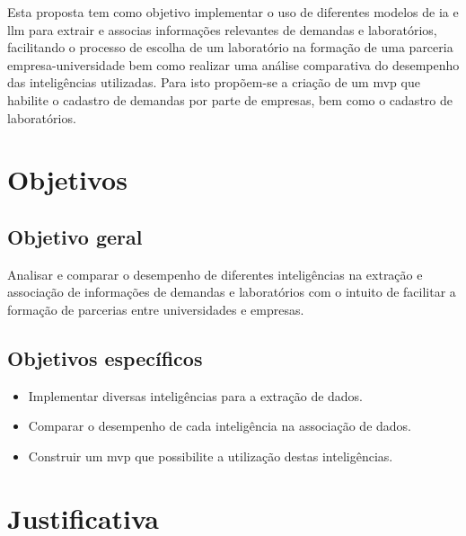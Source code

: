 Esta proposta tem como objetivo implementar o uso de diferentes modelos de  \gls{ia} e \gls{llm} para extrair e associas informações relevantes de demandas e laboratórios, facilitando o processo de escolha de um laboratório na formação de uma parceria empresa-universidade bem como realizar uma análise comparativa do desempenho das inteligências utilizadas. Para isto propõem-se a criação de um \gls{mvp} que habilite o cadastro de demandas por parte de empresas, bem como o cadastro de laboratórios.

\section{Objetivos}\label{sec:objetivos}

\subsection{Objetivo geral}\label{subsec:objetivoGeral}

Analisar e comparar o desempenho de diferentes inteligências na extração e associação de informações de demandas e laboratórios com o intuito de facilitar a formação de parcerias entre universidades e empresas.

\subsection{Objetivos específicos}\label{subsec:objetivosEspecificos}

\begin{itemize}
    \item Implementar diversas inteligências para a extração de dados.
    \item Comparar o desempenho de cada inteligência na associação de dados.
    \item Construir um \gls{mvp} que possibilite a utilização destas inteligências.
\end{itemize}

\section{Justificativa}\label{sec:justificativa}


